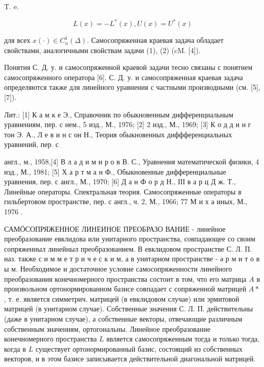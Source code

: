 \documentclass[10pt]{article}
\begin{document}
T. e.



\[

L(x)=-L^{*}(x), U(x)=U^{*}(x)

\]



для всех $x(\cdot) \in C_{n}^{1}(\Delta)$. Самосопряженная краевая задача обладает свойствами, аналогичными свойствам задачи (1), (2) (cM. [4]).



Понятия С. Д. у. и самосопряженной краевой задачи тесно связаны с понятием самосопряженного оператора [6]. С. Д. у. и самосопряженная краевая задача определяются также для линейного уравнения с частными производными (см. [5], [7]).



Лит.: [1] К а м к е Э., Справочник по обыкновенным дифференциальным уравнениям, пер. с нем., 5 изд., М., 1976; [2] 2 изд., М., 1969; [3] К о д д и н г тон Э. А., Л е в и н с он Н., Теория обыкновенных диффференциальных уравнений, пер. с

англ., м., 1958,[4] В л а д и м и р о в В. С., Уравнения математической физики, 4 изд., М., 1981; [5] Х а р т м а н Ф., Обыкновенные дифференциальные уравнения, пер. с англ., М., 1970; [6] Д а н Ф о р д Н., ІІІ в а р ц Д ж. Т., Линейные операторы. Спектральная теория. Самосопряженные операторы в гильбертовом пространстве, пер. с англ., ч. 2, М., 1966; 77 М и х а иных, М., 1976 .



САМӦСОПРЯЖЕННОЕ ЛИНЕИНОЕ ПРЕОБРАЗО ВАНИЕ - линейное преобразование евклидова или унитарного пространства, совпадающее со своим сопряженныл линейныл преобразованием. В евклидовом пространстве С. Л. П. наз. также с и м м е т р и ч е с к и м, а в унитарном пространстве - ә р м и т о в ы м. Необходимое и достаточное условие самосопряженности линейного преобразования конечномерного пространства состоит в том, что его матрица $A$ в произвольном ортонормированном базисе совпадает с сопряженной матрицей $A *$, т. е. является симметрич. матрицей (в евклидовом случае) или эрмитовой матрицей (в унитарном случае). Собственные значения С. Л. П. действительны (даже в унитарном случае), а собственные векторы, отвечающие различным собственным значениям, ортогональны. Линейное преобразование конечномерного пространства $L$ является самосопряженным тогда и только тогда, когда в $L$ существует ортонормированный базис, состоящий из собственных векторов, и в этом базисе записывается действительной диагональной матрицей.
\end{document}
